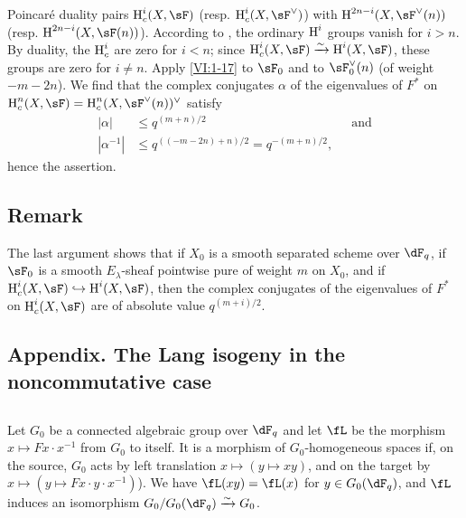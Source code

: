 Poincaré duality pairs $\h_c^i(X,\sF)$ (resp. 
$\h_c^i(X,\sF^\vee)$) with $\h^{2n-i}(X,\sF^\vee(n))$ (resp. 
$\h^{2n-i}(X,\sF(n))$). According to \cite[XIV 3.2]{sga4}, the ordinary $\operatorname{H}^i$ groups 
vanish for $i>n$. By duality, the $\operatorname{H}_c^i$ are zero for $i<n$; since 
$\h_c^i(X,\sF) \iso \h^i(X,\sF)$, these groups are zero for $i\ne n$. 
Apply \ref{VI:1-17} to $\sF_0$ and to $\sF_0^\vee(n)$ (of weight 
$-m-2n$). We find that the complex conjugates $\alpha$ of the eigenvalues 
of $F^\ast$ on $\h_c^n(X,\sF) = \h_c^n(X,\sF^\vee(n))^\vee$ satisfy 
\begin{align*}
  |\alpha| &\leqslant q^{(m+n)/2} && \text{and} \\
  |\alpha^{-1}| &\leqslant q^{((-m-2n)+n)/2} = q^{-(m+n)/2} \text{,}
\end{align*}
hence the assertion. 





\subsection{Remark}\label{VI:1-21}

The last argument shows that if $X_0$ is a smooth separated scheme over 
$\dF_q$, if $\sF_0$ is a smooth $E_\lambda$-sheaf pointwise pure of weight 
$m$ on $X_0$, and if $\h_c^i(X,\sF) \hookrightarrow \h^i(X,\sF)$, then the 
complex conjugates of the eigenvalues of $F^\ast$ on $\h_c^i(X,\sF)$ are 
of absolute value $q^{(m+i)/2}$. 





\subsection*{Appendix. The Lang isogeny in the noncommutative case}




\subsection{}\label{VI:1-22}

Let $G_0$ be a connected algebraic group over $\dF_q$ and let $\fL$ be the morphism 
$x\mapsto F x\cdot x^{-1}$ from $G_0$ to itself. It is a morphism of 
$G_0$-homogeneous spaces if, on the source, $G_0$ acts by left translation 
$x\mapsto (y\mapsto x y)$, and on the target by 
$x\mapsto (y\mapsto F x\cdot y\cdot x^{-1})$). We have $\fL(xy) = \fL(x)$ for 
$y\in G_0(\dF_q)$, and $\fL$ induces an isomorphism $G_0/G_0(\dF_q)\iso G_0$. 

